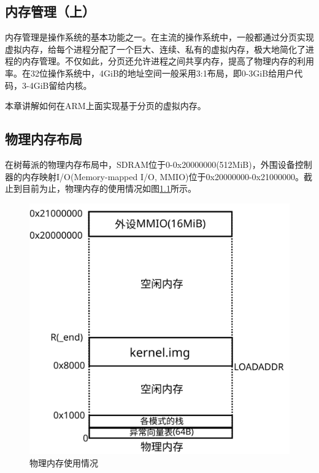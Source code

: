 \documentclass[main.tex]{subfiles}
\begin{document}
\ifxetex\else\begin{CJK*}{UTF8}{song}\fi

\chapter{内存管理（上）}
内存管理是操作系统的基本功能之一。在主流的操作系统中，一般都通过分页实现虚拟内存，给每个进程分配了一个巨大、连续、私有的虚拟内存，极大地简化了进程的内存管理。不仅如此，分页还允许进程之间共享内存，提高了物理内存的利用率。在32位操作系统中，4GiB的地址空间一般采用3:1布局，即0-3GiB给用户代码，3-4GiB留给内核。

\par
本章讲解如何在ARM上面实现基于分页的虚拟内存。

\section{物理内存布局}
在树莓派的物理内存布局中，SDRAM位于0-0x20000000(512MiB)，外围设备控制器的内存映射I/O(Memory-mapped I/O, MMIO)位于0x20000000-0x21000000。截止到目前为止，物理内存的使用情况如图\ref{figure:4-1}所示。

\begin{figure}[htp]
\centering
\includegraphics[scale=0.3]{figures/4-1}
\caption{物理内存使用情况}
\label{figure:4-1}
\end{figure}


\end{CJK*}
\end{document}
